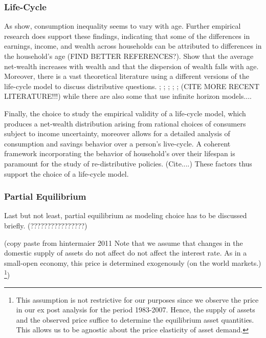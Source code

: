 \documentclass[a4paper,12pt]{article}
\begin{document}
\subsubsection{Life-Cycle}

As \cite{deaton1994} show, consumption inequality seems to vary with age. Further empirical research does support these findings, indicating that some of the differences in earnings, income, and wealth across households can be attributed to differences in the household's age \cite{rios2016} (FIND BETTER REFERENCES?). \cite{hintermaier2011} Show that the average net-wealth increases with wealth and that the dispersion of wealth falls with age. 
Moreover, there is a vast theoretical literature using a different versions of the life-cycle model to discuss distributive questions.  \cite{Gourinchas&Parker2002}; \cite{cagetti2003}; \cite{castaneda2003}; \cite{yang2009}; \cite{kaplan2010};\cite{hintermaier2011} (CITE MORE RECENT LITERATURE!!!)
while there are also some that use infinite horizon models....

Finally, the choice to study the empirical validity of a life-cycle model, which produces a net-wealth distribution arising from rational choices of consumers subject to income uncertainty, moreover allows for a detailed analysis of consumption and savings behavior over a person's live-cycle. A coherent framework incorporating the behavior of household's over their lifespan is paramount for the study of re-distributive policies. (Cite....)
These factors thus support the choice of a life-cycle model. 


\subsubsection{Partial Equilibrium}
Last but not least, partial equilibrium as modeling choice has to be discussed briefly. (????????????????)

(copy paste from hintermaier 2011
Note that we assume that changes in the domestic supply of assets do not affect do not affect the interest rate. As in a small-open economy, this price is determined exogenously (on the world markets.) \footnote{This assumption is not restrictive for our purposes since we observe the price in our ex post analysis for the period 1983-2007. Hence, the supply of assets and the observed price suffice to determine the equilibrium asset quantities. This allows us to be agnostic about the price elasticity of asset demand.})
\end{document}
